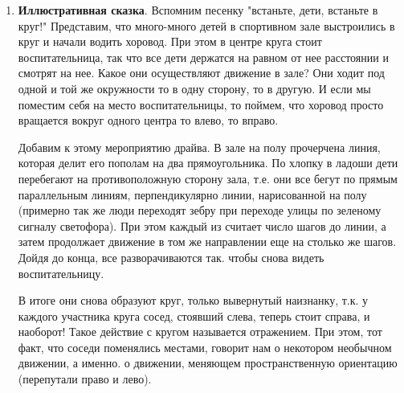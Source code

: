 
\begin{enumerate}
\item \textbf{Иллюстративная сказка}. Вспомним песенку "встаньте, дети, встаньте в круг!" Представим, что много-много детей в спортивном зале выстроились в круг и начали водить хоровод. При этом в центре круга стоит воспитательница, так что все дети держатся на равном от нее расстоянии и смотрят на нее. Какое они осуществляют движение в зале? Они ходит под одной и той же окружности то в одну сторону, то в другую. И если мы поместим себя на место воспитательницы, то поймем, что хоровод просто вращается вокруг одного центра то влево, то вправо.

Добавим к этому мероприятию драйва. В зале на полу прочерчена линия, которая делит его пополам на два прямоугольника. По хлопку в ладоши дети перебегают на противоположную сторону зала, т.е. они все бегут по прямым параллельным линиям, перпендикулярно линии, нарисованной на полу (примерно так же люди переходят зебру при переходе улицы по зеленому сигналу светофора). При этом каждый из считает число шагов до линии, а затем продолжает движение в том же направлении еще на столько же шагов. Дойдя до конца, все разворачиваются так. чтобы снова видеть воспитательницу.

В итоге они снова образуют круг, только вывернутый наизнанку, т.к. у каждого участника круга сосед, стоявший слева, теперь стоит справа, и наоборот! Такое действие с кругом называется отражением. При этом, тот факт, что соседи поменялись местами, говорит нам о некотором необычном движении, а именно. о движении, меняющем пространственную ориентацию (перепутали право и лево).


\end{enumerate}
